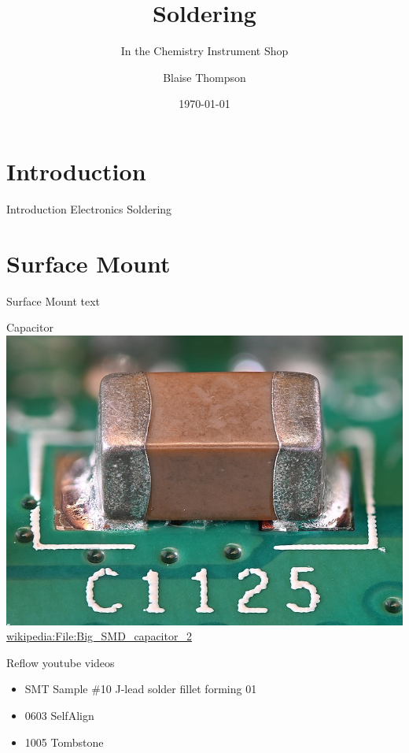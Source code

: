 \documentclass{presentation}
\title{Soldering}
\subtitle{In the Chemistry Instrument Shop}
\author{Blaise Thompson}
\institute{University of Wisconsin--Madison}
\date{\today}
\begin{document}
\maketitle

\section{Introduction}

\begin{frame}{Introduction}
  Electronics Soldering
\end{frame}

\section{Surface Mount}

\begin{frame}{Surface Mount}
  text
\end{frame}

\begin{frame}{Capacitor}
  \centering
  \includegraphics[width=\textwidth*3/4]{./Big_SMD_capacitor_2.jpg} \\
  \url{wikipedia:File:Big_SMD_capacitor_2}
\end{frame}

\begin{frame}{Reflow}
  youtube videos
  \begin{itemize}
    \item SMT \: Sample \#10 J-lead solder fillet forming 01
    \item 0603 SelfAlign
    \item 1005 Tombstone
  \end{itemize}
\end{frame}
\end{document}

